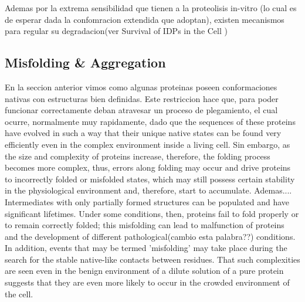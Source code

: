Ademas por la extrema sensibilidad que tienen a la proteolisis in-vitro (lo cual es de esperar dada la confomracion extendida que adoptan), 
existen mecanismos para regular su degradacion(ver \cite{habchi2014introducing} Survival of IDPs in the Cell )





















































\subsection{Misfolding \& Aggregation}




En la seccion anterior vimos como algunas proteinas poseen conformaciones nativas con estructuras bien definidas.
Este restriccion hace que, para poder funcionar correctamente deban atravesar un proceso de plegamiento, el cual ocurre, normalmente muy rapidamente, dado que 
the sequences of these proteins have evolved in such a way that their unique native states can be found very efficiently even in the complex environment inside a living cell.
Sin embargo, as the size and complexity of proteins increase, therefore, the folding process becomes more complex,
thus, errors along folding may occur and drive proteins to incorrectly folded or misfolded states, which may still possess certain stability in the physiological
environment and, therefore, start to accumulate. 
Ademas....
Intermediates with only partially formed structures can be populated and have significant lifetimes. 
Under some conditions, then, proteins fail to fold properly or to remain correctly folded; this misfolding can lead to malfunction of proteins and the development of different pathological(cambio esta palabra??) conditions.
In addition, events that may be termed 'misfolding' may take place during the search for the stable native-like contacts between residues. 
That such complexities are seen even in the benign environment of a dilute solution of a pure protein suggests that they are even more likely to occur in the crowded environment of the cell.

